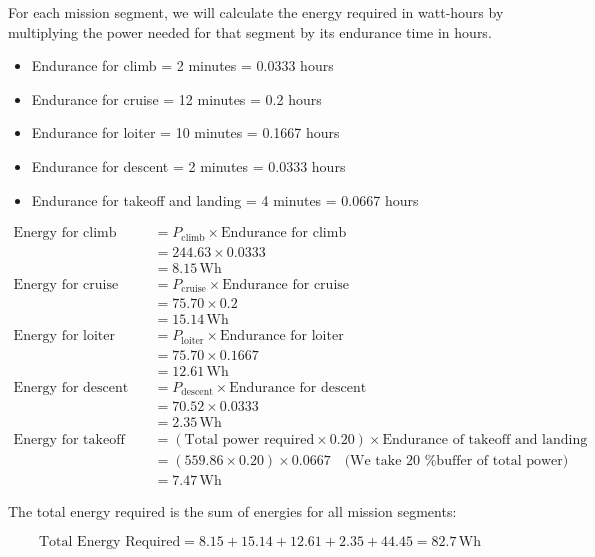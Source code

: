 \documentclass[12 pt]{article}
\begin{document}
For each mission segment, we will calculate the energy required in watt-hours by multiplying the power needed for that segment by its endurance time in hours.

\begin{itemize}
    \item Endurance for climb = 2 minutes = 0.0333 hours
    \item Endurance for cruise = 12 minutes = 0.2 hours
    \item Endurance for loiter = 10 minutes = 0.1667 hours
    \item Endurance for descent = 2 minutes = 0.0333 hours
    \item Endurance for takeoff and landing = 4 minutes = 0.0667 hours
\end{itemize}

\begin{align*}
\text{Energy for climb} &= P_{\text{climb}} \times \text{Endurance for climb} \\
&= 244.63 \times 0.0333 \\
&= 8.15 \, \text{Wh} \\[10pt]
\text{Energy for cruise} &= P_{\text{cruise}} \times \text{Endurance for cruise} \\
&= 75.70 \times 0.2 \\
&= 15.14 \, \text{Wh} \\[10pt]
\text{Energy for loiter} &= P_{\text{loiter}} \times \text{Endurance for loiter} \\
&= 75.70 \times 0.1667 \\
&= 12.61 \, \text{Wh} \\[10pt]
\text{Energy for descent} &= P_{\text{descent}} \times \text{Endurance for descent} \\
&= 70.52 \times 0.0333 \\
&= 2.35 \, \text{Wh} \\[10pt]
\text{Energy for takeoff and landing} &= (\text{Total power required} \times 0.20) \times \text{Endurance of takeoff and landing} \\
&= (559.86 \times 0.20) \times 0.0667 \quad \text{(We take 20 \% buffer of total power)} \\
&= 7.47 \, \text{Wh}
\end{align*}

The total energy required is the sum of energies for all mission segments:

\[
\text{Total Energy Required} = 8.15 + 15.14 + 12.61 + 2.35 + 44.45 = 82.7 \, \text{Wh}
\]
\end{document}
